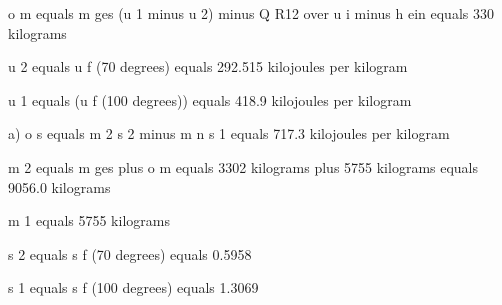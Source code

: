 o m equals m ges (u 1 minus u 2) minus Q R12 over u i minus h ein equals 330 kilograms

u 2 equals u f (70 degrees) equals 292.515 kilojoules per kilogram

u 1 equals (u f (100 degrees)) equals 418.9 kilojoules per kilogram

a) o s equals m 2 s 2 minus m n s 1 equals 717.3 kilojoules per kilogram

m 2 equals m ges plus o m equals 3302 kilograms plus 5755 kilograms equals 9056.0 kilograms

m 1 equals 5755 kilograms

s 2 equals s f (70 degrees) equals 0.5958

s 1 equals s f (100 degrees) equals 1.3069